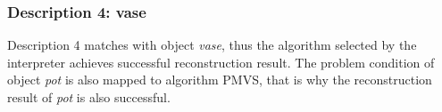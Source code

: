 \subsubsection{Description 4: vase}
Description 4 matches with object \textit{vase}, thus the algorithm selected by the interpreter achieves successful reconstruction result. The problem condition of object \textit{pot} is also mapped to algorithm PMVS, that is why the reconstruction result of \textit{pot} is also successful.





